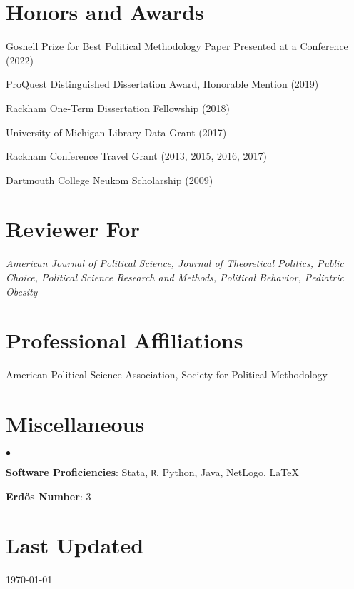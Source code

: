 \documentclass[margin,line]{res}
\newenvironment{list2}{
  \begin{list}{$\bullet$}{%
      \setlength{\itemsep}{0in}
      \setlength{\parsep}{0in} \setlength{\parskip}{0in}
      \setlength{\topsep}{0in} \setlength{\partopsep}{0in} 
      \setlength{\leftmargin}{0.2in}}}{\end{list}}
\begin{document}
\begin{resume}
\section{\sc Honors and Awards} 

Gosnell Prize for Best Political Methodology Paper Presented at a Conference (2022)

ProQuest Distinguished Dissertation Award, Honorable Mention (2019)

Rackham One-Term Dissertation Fellowship (2018)

University of Michigan Library Data Grant (2017)

Rackham Conference Travel Grant (2013, 2015, 2016, 2017)

Dartmouth College Neukom Scholarship (2009)



\section{\sc Reviewer For}
\textit{American Journal of Political Science, Journal of Theoretical Politics, Public Choice, Political Science Research and Methods, Political Behavior, Pediatric Obesity}

\section{\sc Professional Affiliations}
American Political Science Association, Society for Political Methodology





\section{\sc Miscellaneous}
\begin{list2}
	\item \textbf{Software Proficiencies}: Stata, {\tt R}, Python, Java, NetLogo, \LaTeX
	\item \textbf{Erd{\H o}s Number}: 3
\end{list2}


\section{\sc Last Updated}
\today

%

\end{resume}
\end{document}

